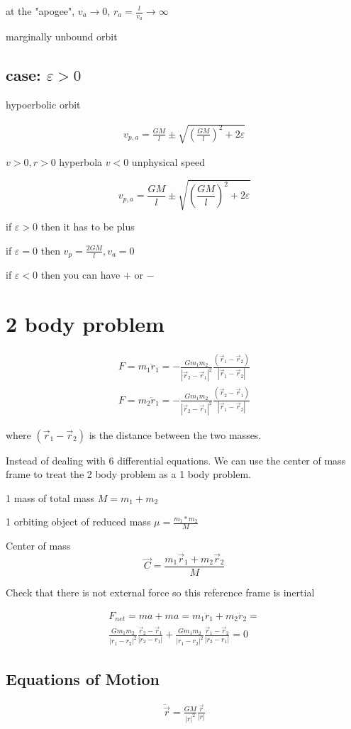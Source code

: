 \documentclass[fleqn]{report}
\newcommand{\equations} [1] {
\begin{gather*}
#1
\end{gather*}
}
\begin{document}
at the "apogee", $v_a \to 0$, $r_a = \frac{l}{v_a} \to \infty$

marginally unbound orbit 

\subsection{case: $\varepsilon > 0$}
hypoerbolic orbit 

\equations{
    v_{p, a} = \frac{GM}{l} \pm \sqrt{\left( \frac{GM}{l} \right)^2 + 2 \varepsilon}
}
$v > 0, r > 0$ hyperbola $v < 0$ unphysical speed 


\[
    v_{p, a} = \frac{GM}{l} \pm \sqrt{\left( \frac{GM}{l} \right)^2 + 2 \varepsilon}
\]

if $\varepsilon > 0$ then it has to be plus 

if $\varepsilon = 0$ then $v_p = \frac{2GM}{l}, v_a = 0$

if $\varepsilon < 0$ then you can have $+$ or $-$



\section{2 body problem}
\equations{
    F = m_1 \ddot r_1 = - \frac{Gm_1 m_2}{|\vec r_2 - \vec r_1|^2} 
    \frac{(\vec r_1 - \vec r_2)}{|\vec r_1 - \vec r_2|}
    \\
    F = m_2 \ddot r_1 = - \frac{Gm_1 m_2}{|\vec r_2 - \vec r_1|^2} 
    \frac{(\vec r_2 - \vec r_1)}{|\vec r_1 - \vec r_2|}
}

where $(\vec r_1 - \vec r_2)$ is the distance between the two masses. 

Instead of dealing with 6 differential equations. We can use the center of mass frame to treat the 2 body problem as a 1 body problem. 

1 mass of total mass $M = m_1 + m_2$

1 orbiting object of reduced mass $\mu = \frac{m_1 * m_2}{M}$

Center of mass 
\[
\vec C = \frac{m_1 \vec r_1 + m_2 \vec r_2}{M}
\]

Check that there is not external force so this reference frame is inertial 
\equations{
    F_{net} = ma + ma = m_1 \ddot r_1 + m_2 \ddot r_2 = 
    \\
    \frac{Gm_1 m_2}{|r_1 - r_2|^2} \frac{\vec r_2 - \vec r_1}{|r_2 - r_1|} + 
    \frac{Gm_1 m_2}{|r_1 - r_2|^2} \frac{\vec r_1 - \vec r_2}{|r_2 - r_1|}
    =
    0
}

\subsection{Equations of Motion}
\equations{
    \ddot \vec r = \frac{GM}{|r|^2} \frac{\vec r}{|r|}
}
\end{document}
